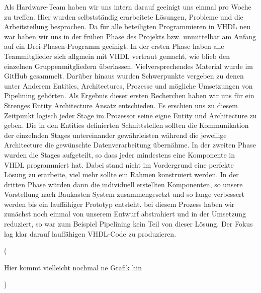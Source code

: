 \documentclass[paper=a4,fontsize=12pt]{scrreprt}
\begin{document}
Als Hardware-Team haben wir uns intern darauf geeinigt uns einmal pro Woche zu treffen. Hier wurden selbstständig erarbeitete Lösungen, Probleme und die Arbeitsteilung besprochen. Da für alle beteiligten Programmieren in VHDL neu war haben wir uns in der frühen Phase des Projekts bzw. unmittelbar am Anfang auf ein Drei-Phasen-Programm geeinigt.
In der ersten Phase haben alle Teammitglieder sich allgmein mit VHDL vertraut gemacht, wie blieb den einzelnen Gruppenmitgliedern überlassen. Vielversprechendes Material wurde im GitHub gesammelt. Darüber hinaus wurden Schwerpunkte vergeben zu denen unter Anderem Entities, Architectures, Prozesse und mögliche Umsetzungen von Pipelining gehörten. Als Ergebnis dieser ersten Recherchen haben wir uns für ein Strenges Entity Architecture Ansatz entschieden.
Es erschien uns zu diesem Zeitpunkt logisch jeder Stage im Prozessor seine eigne Entity und Architecture zu geben. Die in den Entities definierten Schnittstellen sollten die Kommunikation der einzelnden Stages untereinander gewährleisten während die jeweilige Architecture die gewünschte Datenverarbeitung übernähme.
In der zweiten Phase wurden die Stages aufgeteilt, so dass jeder mindestens eine Komponente in VHDL programmiert hat. Dabei stand nicht im Vordergrund eine perfekte Lösung zu erarbeite, viel mehr sollte ein Rahmen konstruiert werden. In der dritten Phase würden dann die individuell erstellten Komponenten, so unsere Vorstellung nach Baukasten System zusammengesetzt und so lange verbessert werden bis ein lauffähiger Prototyp entsteht. 
bei diesem Prozess haben wir zunächst noch einmal von unserem Entwurf abstrahiert und in der Umsetzung reduziert, so war zum Beispiel Pipelining kein Teil von dieser Lösung. Der Fokus lag klar darauf lauffähigen VHDL-Code zu produzieren.


(

Hier kommt vielleicht nochmal ne Grafik hin

)
\end{document}
